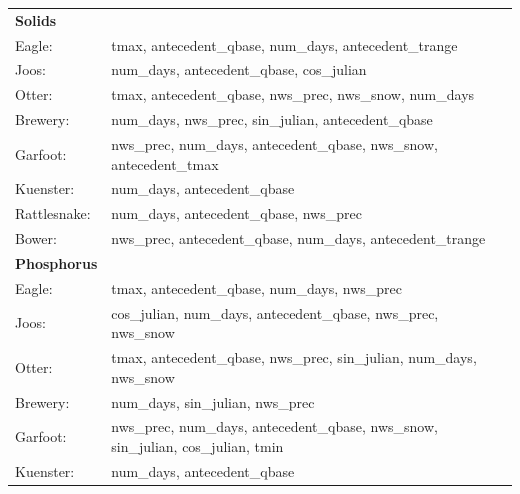\documentclass[12pt]{article}
\begin{document}
\begin{table}[h!]\small
    \begin{center}
    \begin{tabular}{ll}
        \textbf{Solids} & \\
        \hspace{5mm} Eagle: & tmax, antecedent\_qbase, num\_days, antecedent\_trange\\
        \hspace{5mm} Joos: & num\_days, antecedent\_qbase, cos\_julian\\
        \hspace{5mm} Otter: & tmax, antecedent\_qbase, nws\_prec, nws\_snow, num\_days\\
        \hspace{5mm} Brewery: & num\_days, nws\_prec, sin\_julian, antecedent\_qbase\\
        \hspace{5mm} Garfoot: & nws\_prec, num\_days, antecedent\_qbase, nws\_snow, antecedent\_tmax\\
        \hspace{5mm} Kuenster: & num\_days, antecedent\_qbase\\
        \hspace{5mm} Rattlesnake: & num\_days, antecedent\_qbase, nws\_prec \\
        \hspace{5mm} Bower: & nws\_prec, antecedent\_qbase, num\_days, antecedent\_trange
    \vspace{2mm}\\
        \textbf{Phosphorus} & \\
        \hspace{5mm} Eagle: & tmax, antecedent\_qbase, num\_days, nws\_prec\\
        \hspace{5mm} Joos: & cos\_julian, num\_days, antecedent\_qbase, nws\_prec, nws\_snow\\
        \hspace{5mm} Otter: & tmax, antecedent\_qbase, nws\_prec, sin\_julian, num\_days, nws\_snow\\
        \hspace{5mm} Brewery: & num\_days, sin\_julian, nws\_prec\\
        \hspace{5mm} Garfoot: & nws\_prec, num\_days, antecedent\_qbase, nws\_snow, sin\_julian, cos\_julian, tmin\\
        \hspace{5mm} Kuenster: & num\_days, antecedent\_qbase\\

\end{tabular}
\end{center}
\end{table}
\end{document}
